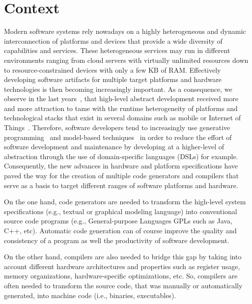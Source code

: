 

\section{Context}
Modern software systems rely nowadays on a highly heterogeneous and dynamic interconnection of platforms and devices that provide a wide diversity of capabilities and services. These heterogeneous services may run in different environments ranging from cloud servers with virtually unlimited resources down to resource-constrained devices with only a few KB of RAM. Effectively developing software artifacts for multiple target platforms and hardware technologies is then becoming increasingly important. As a consequence, we observe in the last years~\cite{Czarnecki:2000:GPM:345203}, that high-level abstract development received more and more attraction to tame with the runtime heterogeneity of platforms and technological stacks that exist in several domains such as mobile or Internet of Things~\cite{betz2011improving}.
Therefore, software developers tend to increasingly use generative programming~\cite{Czarnecki:2000:GPM:345203} and model-based techniques~\cite{france2007model} in order to reduce the effort of software development and maintenance by developing at a higher-level of abstraction through the use of domain-specific languages (DSLs) for example. 
Consequently, the new advances in hardware and platform specifications have paved the way for the creation of multiple code generators and compilers that serve as a basis to target different ranges of software platforms and hardware. 

On the one hand, code generators are needed to transform the high-level system specifications (e.g., textual or graphical modeling language) into conventional source code programs (e.g., General-purpose Languages GPLs such as Java, C++, etc). Automatic code generation can of course improve the quality and consistency of a program as well the productivity of software development.

On the other hand, compilers are also needed to bridge this gap by taking into account different hardware architectures and properties such as register usage, memory organizations, hardware-specific optimizations, etc. So, compilers are often needed to transform the source code, that was manually or automatically generated, into machine code (i.e., binaries, executables). 


